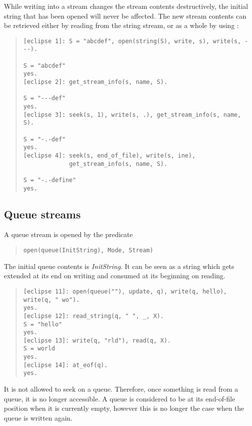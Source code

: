 While writing into a stream changes the stream contents destructively,
the initial string that has been opened will never be affected.
The new stream contents can be retrieved either by reading from the string
stream, or as a whole by using
:
\begin{quote}\begin{verbatim}
[eclipse 1]: S = "abcdef", open(string(S), write, s), write(s, ---).

S = "abcdef"
yes.
[eclipse 2]: get_stream_info(s, name, S).

S = "---def"
yes.
[eclipse 3]: seek(s, 1), write(s, .), get_stream_info(s, name, S).

S = "-.-def"
yes.
[eclipse 4]: seek(s, end_of_file), write(s, ine),
             get_stream_info(s, name, S).

S = "-.-define"
yes.
\end{verbatim}\end{quote}


\subsection{Queue streams}
\label{queueio}
A queue stream is opened by the  predicate
\begin{quote}\begin{verbatim}
open(queue(InitString), Mode, Stream)
\end{verbatim}\end{quote}
The initial queue contents is {\it InitString}.
It can be seen as a string which gets extended at its end on writing
and consumed at its beginning on reading.
\begin{quote}\begin{verbatim}
[eclipse 11]: open(queue(""), update, q), write(q, hello), write(q, " wo").
yes.
[eclipse 12]: read_string(q, " ", _, X).
S = "hello"
yes.
[eclipse 13]: write(q, "rld"), read(q, X).
S = world
yes.
[eclipse 14]: at_eof(q).
yes.
\end{verbatim}\end{quote} 
It is not allowed to seek on a queue. Therefore, once something is read
from a queue, it is no longer accessible. A queue is considered to be
at its end-of-file position when it is currently empty, however this
is no longer the case when the queue is written again.


